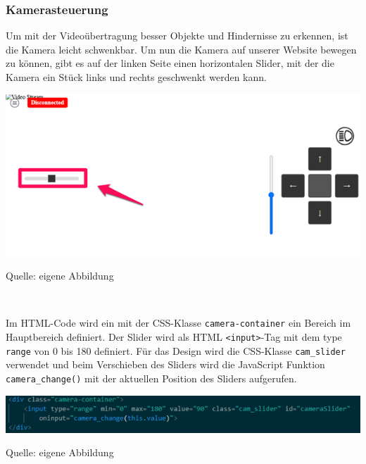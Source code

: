 \documentclass[ngerman,12pt,a4paper]{article}
\begin{document}
				\subsubsection*{Kamerasteuerung}
				
	Um mit der Videoübertragung besser Objekte und Hindernisse zu erkennen, ist die Kamera leicht schwenkbar. Um nun die Kamera auf unserer Website bewegen zu können, gibt es auf der linken Seite einen horizontalen Slider, mit der die Kamera ein Stück links und rechts geschwenkt werden kann. \\[0.5cm]
	\begin{center}
		\begin{minipage}[t]{1\textwidth}
			\includegraphics[scale=0.9]{Pictures/kamera-web}
			\label{fig:kamera-web}
			\vspace{-10pt}
			\begin{center}
				\par\small Quelle: eigene Abbildung 
			\end{center}
		\end{minipage} \\[0.75cm]
	\end{center}
	Im HTML-Code wird ein mit der CSS-Klasse \texttt{camera-container} ein Bereich im Hauptbereich definiert. Der Slider wird als HTML \texttt{<input>}-Tag mit dem type \texttt{range} von 0 bis 180 definiert. Für das Design wird die CSS-Klasse \texttt{cam\_slider} verwendet und beim Verschieben des Sliders wird die JavaScript Funktion \texttt{camera\_change()} mit der aktuellen Position des Sliders aufgerufen. \\[0.5cm]
	\begin{center}
		\begin{minipage}[t]{1\textwidth}
			\includegraphics{Pictures/kamera-html}
			\label{fig:kamera-html}
			\vspace{-10pt}
			\begin{center}
				\par\small Quelle: eigene Abbildung 
			\end{center}
		\end{minipage} \\[0.75cm]
	\end{center}
\end{document}
